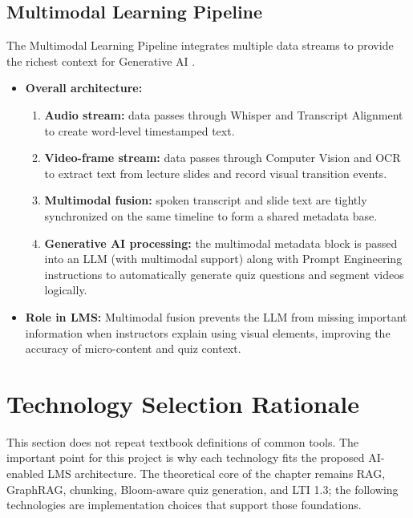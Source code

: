 \subsection{Multimodal Learning Pipeline}
The Multimodal Learning Pipeline integrates multiple data streams to
provide the richest context for Generative AI \cite{baltrusaitis2018multimodal}.
\begin{itemize}
    \item \textbf{Overall architecture:}
    \begin{enumerate}
        \item \textbf{Audio stream:} data passes through Whisper and
              Transcript Alignment to create word-level timestamped text.
        \item \textbf{Video-frame stream:} data passes through Computer
              Vision and OCR to extract text from lecture slides and
              record visual transition events.
        \item \textbf{Multimodal fusion:} spoken transcript and slide text
              are tightly synchronized on the same timeline to form a
              shared metadata base.
        \item \textbf{Generative AI processing:} the multimodal metadata
              block is passed into an LLM (with multimodal support) along
              with Prompt Engineering instructions to automatically
              generate quiz questions and segment videos logically.
    \end{enumerate}
    \item \textbf{Role in LMS:} Multimodal fusion prevents the LLM from
          missing important information when instructors explain using
          visual elements, improving the accuracy of micro-content and
          quiz context.
\end{itemize}

\section{Technology Selection Rationale}
\label{sec:technology-selection-rationale}

This section does not repeat textbook definitions of common tools. The
important point for this project is why each technology fits the proposed
AI-enabled LMS architecture. The theoretical core of the chapter remains
RAG, GraphRAG, chunking, Bloom-aware quiz generation, and LTI 1.3; the
following technologies are implementation choices that support those
foundations.

